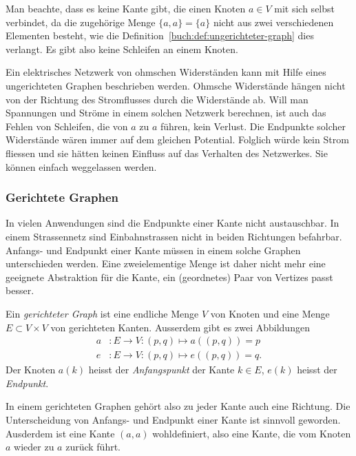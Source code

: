 Man beachte, dass es keine Kante gibt, die einen Knoten $a\in V$
mit sich selbst verbindet, da die zugehörige Menge $\{a,a\}=\{a\}$
nicht aus zwei verschiedenen Elementen besteht, wie die
Definition~\ref{buch:def:ungerichteter-graph} dies verlangt.
Es gibt also keine Schleifen an einem Knoten.

\begin{beispiel}
Ein elektrisches Netzwerk von ohmschen Widerständen kann mit Hilfe
eines ungerichteten Graphen beschrieben werden.
Ohmsche Widerstände hängen nicht von der Richtung des Stromflusses
durch die Widerstände ab.
Will man Spannungen und Ströme in einem solchen Netzwerk berechnen,
ist auch das Fehlen von Schleifen, die von $a$ zu $a$ führen, kein
Verlust.
Die Endpunkte solcher Widerstände wären immer auf dem gleichen Potential.
Folglich würde kein Strom fliessen und sie hätten keinen Einfluss auf
das Verhalten des Netzwerkes.
Sie können einfach weggelassen werden.
\end{beispiel}

\subsubsection{Gerichtete Graphen}
In vielen Anwendungen sind die Endpunkte einer Kante nicht austauschbar.
In einem Strassennetz sind Einbahnstrassen nicht in beiden Richtungen
befahrbar.
Anfangs- und Endpunkt einer Kante müssen in einem solche Graphen
unterschieden werden.
Eine zweielementige Menge ist daher nicht mehr eine geeignete Abstraktion
für die Kante, ein (geordnetes) Paar von Vertizes passt besser.

\begin{definition}
\label{buch:def:gerichteter-graph}
%
%
Ein {\em gerichteter Graph} ist eine endliche Menge $V$ von Knoten
und eine Menge $E \subset V\times V$ von gerichteten Kanten.
Ausserdem gibt es zwei Abbildungen
\[
\begin{aligned}
a&\colon E\to V: (p,q) \mapsto a((p,q)) = p
\\
e&\colon E\to V: (p,q) \mapsto e((p,q)) = q.
\end{aligned}
\]
Der Knoten $a(k)$ heisst der {\em Anfangspunkt} der Kante $k\in E$,
$e(k)$ heisst der {\em Endpunkt}.
\end{definition}

In einem gerichteten Graphen gehört also zu jeder Kante auch eine Richtung.
Die Unterscheidung von Anfangs- und Endpunkt einer Kante ist sinnvoll
geworden.
Ausderdem ist eine Kante $(a,a)$ wohldefiniert, also eine Kante, die vom
Knoten $a$ wieder zu $a$ zurück führt.

